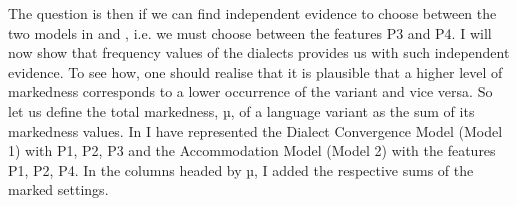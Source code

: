\documentclass[output=paper,hidelinks,draftmode]{langscibook}
\begin{document}
The question is then if we can find independent evidence to choose between the two models in  and , i.e. we must choose between the features P3 and P4. I will now show that frequency values of the dialects provides us with such independent evidence. To see how, one should realise that it is plausible that a higher level of markedness corresponds to a lower occurrence of the variant and vice versa. So let us define the total markedness, µ, of a language variant as the sum of its markedness values. In  I have represented the Dialect Convergence Model (Model 1) with P1, P2, P3 and the Accommodation Model (Model 2) with the features P1, P2, P4. In the columns headed by µ, I added the respective sums of the marked settings.

\begin{table}
\end{table}
\end{document}

